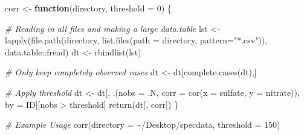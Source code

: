 \documentclass[
]{article}
\newenvironment{Shaded}{\begin{snugshade}}{\end{snugshade}}
\newcommand{\AttributeTok}[1]{\textcolor[rgb]{0.77,0.63,0.00}{#1}}
\newcommand{\CommentTok}[1]{\textcolor[rgb]{0.56,0.35,0.01}{\textit{#1}}}
\newcommand{\ControlFlowTok}[1]{\textcolor[rgb]{0.13,0.29,0.53}{\textbf{#1}}}
\newcommand{\DecValTok}[1]{\textcolor[rgb]{0.00,0.00,0.81}{#1}}
\newcommand{\FunctionTok}[1]{\textcolor[rgb]{0.00,0.00,0.00}{#1}}
\newcommand{\NormalTok}[1]{#1}
\newcommand{\OtherTok}[1]{\textcolor[rgb]{0.56,0.35,0.01}{#1}}
\newcommand{\SpecialCharTok}[1]{\textcolor[rgb]{0.00,0.00,0.00}{#1}}
\newcommand{\StringTok}[1]{\textcolor[rgb]{0.31,0.60,0.02}{#1}}
\begin{document}
\begin{Shaded}
\begin{Highlighting}[]
\NormalTok{corr }\OtherTok{\textless{}{-}} \ControlFlowTok{function}\NormalTok{(directory, }\AttributeTok{threshold =} \DecValTok{0}\NormalTok{) \{}
  
  \CommentTok{\# Reading in all files and making a large data.table}
\NormalTok{  lst }\OtherTok{\textless{}{-}} \FunctionTok{lapply}\NormalTok{(}\FunctionTok{file.path}\NormalTok{(directory, }\FunctionTok{list.files}\NormalTok{(}\AttributeTok{path =}\NormalTok{ directory, }\AttributeTok{pattern=}\StringTok{"*.csv"}\NormalTok{)), data.table}\SpecialCharTok{::}\NormalTok{fread)}
\NormalTok{  dt }\OtherTok{\textless{}{-}} \FunctionTok{rbindlist}\NormalTok{(lst)}
  
  \CommentTok{\# Only keep completely observed cases}
\NormalTok{  dt }\OtherTok{\textless{}{-}}\NormalTok{ dt[}\FunctionTok{complete.cases}\NormalTok{(dt),]}
  
  \CommentTok{\# Apply threshold}
\NormalTok{  dt }\OtherTok{\textless{}{-}}\NormalTok{ dt[, .(}\AttributeTok{nobs =}\NormalTok{ .N, }\AttributeTok{corr =} \FunctionTok{cor}\NormalTok{(}\AttributeTok{x =}\NormalTok{ sulfate, }\AttributeTok{y =}\NormalTok{ nitrate)), by }\OtherTok{=}\NormalTok{ ID][nobs }\SpecialCharTok{\textgreater{}}\NormalTok{ threshold]}
  \FunctionTok{return}\NormalTok{(dt[, corr])}
\NormalTok{\}}

\CommentTok{\# Example Usage}
\FunctionTok{corr}\NormalTok{(}\AttributeTok{directory =} \StringTok{\textquotesingle{}\textasciitilde{}/Desktop/specdata\textquotesingle{}}\NormalTok{, }\AttributeTok{threshold =} \DecValTok{150}\NormalTok{)}


\end{Highlighting}
\end{Shaded}
\end{document}
